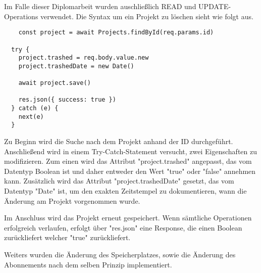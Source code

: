 Im Falle dieser Diplomarbeit wurden auschließlich READ und UPDATE-Operations verwendet. Die Syntax um ein Projekt zu löschen sieht wie folgt aus.

\begin{lstlisting}
    const project = await Projects.findById(req.params.id)

  try {
    project.trashed = req.body.value.new
    project.trashedDate = new Date()

    await project.save()

    res.json({ success: true })
  } catch (e) {
    next(e)
  }
\end{lstlisting}

Zu Beginn wird die Suche nach dem Projekt anhand der ID durchgeführt. Anschließend wird in einem Try-Catch-Statement versucht, zwei Eigenschaften zu modifizieren. Zum einen wird das Attribut "project.trashed" angepasst, das vom Datentyp Boolean ist und daher entweder den Wert "true" oder "false" annehmen kann. Zusätzlich wird das Attribut "project.trashedDate" gesetzt, das vom Datentyp "Date" ist, um den exakten Zeitstempel zu dokumentieren, wann die Änderung am Projekt vorgenommen wurde.

Im Anschluss wird das Projekt erneut gespeichert. Wenn sämtliche Operationen erfolgreich verlaufen, erfolgt über "res.json" eine Response, die einen Boolean zurückliefert welcher "true" zurückliefert.


Weiters wurden die Änderung des Speicherplatzes, sowie die Änderung des Abonnements nach dem selben Prinzip implementiert.

\cite{CRUD_Operations}